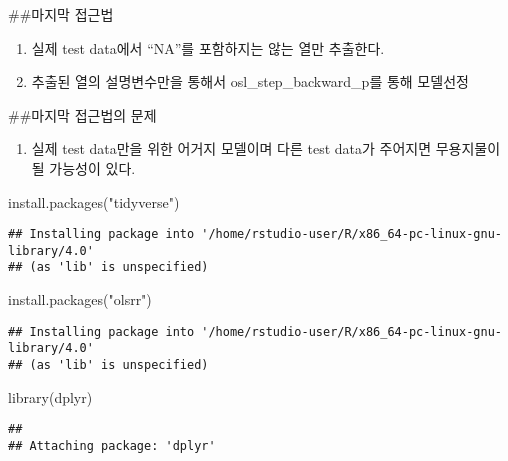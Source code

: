 \documentclass[
]{article}
\newenvironment{Shaded}{\begin{snugshade}}{\end{snugshade}}
\newcommand{\FunctionTok}[1]{\textcolor[rgb]{0.00,0.00,0.00}{#1}}
\newcommand{\NormalTok}[1]{#1}
\newcommand{\StringTok}[1]{\textcolor[rgb]{0.31,0.60,0.02}{#1}}
\providecommand{\tightlist}{%
  \setlength{\itemsep}{0pt}\setlength{\parskip}{0pt}}
\begin{document}
\#\#마지막 접근법

\begin{enumerate}
\def\labelenumi{\arabic{enumi}.}
\tightlist
\item
  실제 test data에서 ``NA''를 포함하지는 않는 열만 추출한다.
\item
  추출된 열의 설명변수만을 통해서 osl\_step\_backward\_p를 통해 모델선정
\end{enumerate}

\#\#마지막 접근법의 문제

\begin{enumerate}
\def\labelenumi{\arabic{enumi}.}
\tightlist
\item
  실제 test data만을 위한 어거지 모델이며 다른 test data가 주어지면
  무용지물이 될 가능성이 있다.
\end{enumerate}

\begin{Shaded}
\begin{Highlighting}[]
\FunctionTok{install.packages}\NormalTok{(}\StringTok{"tidyverse"}\NormalTok{)}
\end{Highlighting}
\end{Shaded}

\begin{verbatim}
## Installing package into '/home/rstudio-user/R/x86_64-pc-linux-gnu-library/4.0'
## (as 'lib' is unspecified)
\end{verbatim}

\begin{Shaded}
\begin{Highlighting}[]
\FunctionTok{install.packages}\NormalTok{(}\StringTok{"olsrr"}\NormalTok{)}
\end{Highlighting}
\end{Shaded}

\begin{verbatim}
## Installing package into '/home/rstudio-user/R/x86_64-pc-linux-gnu-library/4.0'
## (as 'lib' is unspecified)
\end{verbatim}

\begin{Shaded}
\begin{Highlighting}[]
\FunctionTok{library}\NormalTok{(dplyr)}
\end{Highlighting}
\end{Shaded}

\begin{verbatim}
## 
## Attaching package: 'dplyr'
\end{verbatim}
\end{document}
